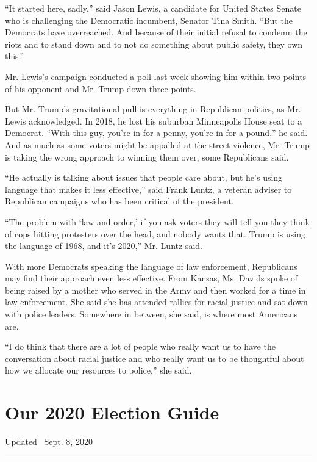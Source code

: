 ``It started here, sadly,'' said Jason Lewis, a candidate for United
States Senate who is challenging the Democratic incumbent, Senator Tina
Smith. ``But the Democrats have overreached. And because of their
initial refusal to condemn the riots and to stand down and to not do
something about public safety, they own this.''

Mr. Lewis's campaign conducted a poll last week showing him within two
points of his opponent and Mr. Trump down three points.

But Mr. Trump's gravitational pull is everything in Republican politics,
as Mr. Lewis acknowledged. In 2018, he lost his suburban Minneapolis
House seat to a Democrat. ``With this guy, you're in for a penny, you're
in for a pound,'' he said. And as much as some voters might be appalled
at the street violence, Mr. Trump is taking the wrong approach to
winning them over, some Republicans said.

``He actually is talking about issues that people care about, but he's
using language that makes it less effective,'' said Frank Luntz, a
veteran adviser to Republican campaigns who has been critical of the
president.

``The problem with `law and order,' if you ask voters they will tell you
they think of cops hitting protesters over the head, and nobody wants
that. Trump is using the language of 1968, and it's 2020,'' Mr. Luntz
said.

With more Democrats speaking the language of law enforcement,
Republicans may find their approach even less effective. From Kansas,
Ms. Davids spoke of being raised by a mother who served in the Army and
then worked for a time in law enforcement. She said she has attended
rallies for racial justice and sat down with police leaders. Somewhere
in between, she said, is where most Americans are.

``I do think that there are a lot of people who really want us to have
the conversation about racial justice and who really want us to be
thoughtful about how we allocate our resources to police,'' she said.

\hypertarget{our-2020-election-guide}{%
\section{Our 2020 Election Guide}\label{our-2020-election-guide}}

Updated ~Sept. 8, 2020

\begin{center}\rule{0.5\linewidth}{\linethickness}\end{center}

